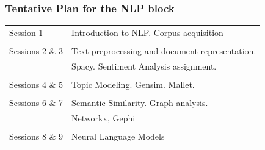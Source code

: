 \documentclass{beamer}
\begin{document}
\begin{frame}

	\frametitle{Tentative Plan for the NLP block}

\begin{tabular}{ll}Session 1 & Introduction to NLP. Corpus acquisition \\
\\
Sessions 2 \& 3 & Text preprocessing and document representation.\\
                & Spacy. Sentiment Analysis assignment. \\
\\
Sessions 4 \& 5 & Topic Modeling. Gensim. Mallet. \\
\\
Sessions 6 \& 7 & Semantic Similarity. Graph analysis. \\
                & Networkx, Gephi \\
\\
Sessions 8 \& 9 & Neural Language Models 
\end{tabular}

\end{frame}
\end{document}
